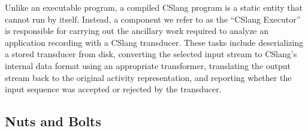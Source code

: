 Unlike an executable program, a compiled CSlang program is a static entity
that cannot run by itself.  Instead, a component we refer to as the
``CSlang Executor'' is responsible for carrying out the ancillary work
required to analyze an application recording with a CSlang transducer.
These tasks include deserializing a stored transducer from disk, converting
the selected input stream to CSlang's internal data format using an
appropriate transformer, translating the output stream back to the original
activity representation, and reporting whether the input sequence was
accepted or rejected by the transducer. 


\subsection{Nuts and Bolts}

